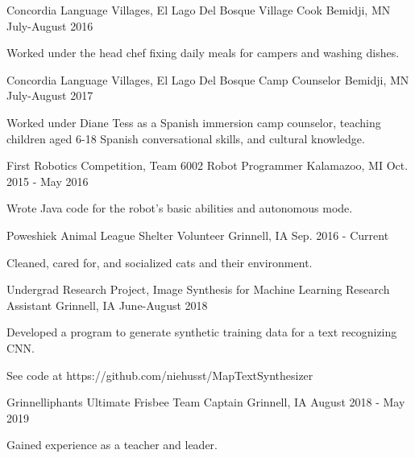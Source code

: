 \begin{cventries}
\cventry
  {Concordia Language Villages, El Lago Del Bosque}
  {Village Cook}
  {Bemidji, MN}
  {July-August 2016}
  {
    \begin{cvitems}
      \item {Worked under the head chef fixing daily meals for campers and
    washing dishes.}
    \end{cvitems}
  }

  \cventry
    {Concordia Language Villages, El Lago Del Bosque}
    {Camp Counselor}
    {Bemidji, MN}
    {July-August 2017}
    {
      \begin{cvitems}
        \item {Worked under Diane Tess as a Spanish immersion camp counselor, teaching children aged 6-18 Spanish conversational skills, and cultural knowledge.}
      \end{cvitems}
    }

  \cventry
    {First Robotics Competition, Team 6002}
    {Robot Programmer}
    {Kalamazoo, MI}
    {Oct. 2015 - May 2016}
    {
      \begin{cvitems}
        \item {Wrote Java code for the robot’s basic abilities and autonomous mode.}
      \end{cvitems}
    }

  \cventry
    {Poweshiek Animal League Shelter}
    {Volunteer}
    {Grinnell, IA}
    {Sep. 2016 - Current}
    {
      \begin{cvitems}
        \item {Cleaned, cared for, and socialized cats and their environment.}
      \end{cvitems}
    }

  \cventry
    {Undergrad Research Project, Image Synthesis for Machine Learning}
    {Research Assistant}
    {Grinnell, IA}
    {June-August 2018}
    {
      \begin{cvitems}
        \item {Developed a program to generate synthetic training data for a text recognizing CNN.}
        \item{See code at https://github.com/niehusst/MapTextSynthesizer}
      \end{cvitems}
    }

  \cventry
    {Grinnelliphants Ultimate Frisbee}
    {Team Captain}
    {Grinnell, IA}
    {August 2018 - May 2019}
    {
      \begin{cvitems}
        \item {Gained experience as a teacher and leader.}
      \end{cvitems}
    }


\end{cventries}
